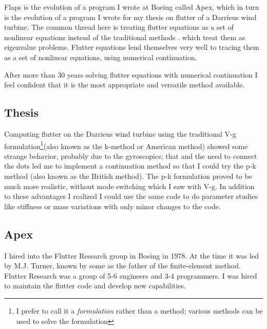 \documentclass[11pt,openany,twoside]{book}
\numberwithin{equation}{section}		%
\begin{document}
Flaps is the evolution of a program I wrote at Boeing called Apex,
which in turn is the evolution of a program I wrote for my thesis on
flutter of a Darrieus wind turbine.
The common thread here is treating flutter equations as a set of nonlinear
equations instead of the traditional methods
\cite{hassig1971approximate,quero2021generalized,chen2000damping,pitt1999new}.
which treat them as
eigenvalue problems. Flutter equations lend themselves very well to
tracing them as a set of nonlinear equations, using numerical continuation.

After more than 30 years solving flutter equations with numerical continuation
I feel confident that it is the most appropriate and versatile method available.

\subsection{Thesis}
Computing flutter on the Darrieus wind turbine using the traditional
V-g formulation\footnote{I prefer to call it a \emph{formulation} rather than a method;
various methods can be used to solve the formulation}(also known as the k-method or
American method) showed some strange behavior, probably due to the gyroscopics;
that and the need to connect the dots led me to implement a continuation method so
that I could try the p-k method \cite{hassig1971approximate} (also known as the British method).
The p-k formulation proved to be
much more realistic, without mode switching which I saw with V-g.
In addition to these advantages I realized I could use the same code
to do parameter studies like stiffness or mass variations with only
minor changes to the code.

\subsection{Apex}
I hired into the Flutter Research group in Boeing in 1978. At the time it was
led by M.J. Turner, known by some as the father of the finite-element method.
Flutter Research was a group of 5-6 engineers and 3-4 programmers.
I was hired to maintain the flutter code and develop new capabilities.
\end{document}
